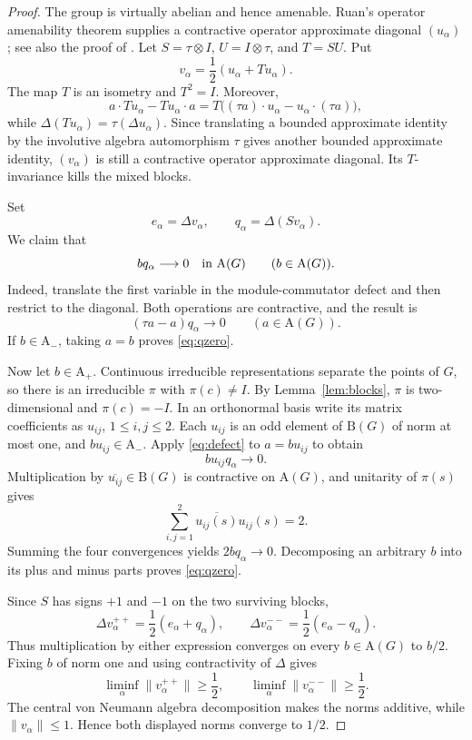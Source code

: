 \documentclass[11pt]{article}
\newcommand{\A}{\mathrm A}
\newcommand{\B}{\mathrm B}
\newcommand{\norm}[1]{\lVert #1\rVert}
\begin{document}
\begin{proof}
The group is virtually abelian and hence amenable.  Ruan's operator
amenability theorem supplies a contractive operator approximate diagonal
$(u_\alpha)$; see also the proof of \cite[Theorem 2.7]{Runde2006}.  Let
$S=\tau\otimes I$, $U=I\otimes\tau$, and $T=SU$.  Put
\[
 v_\alpha=\frac12(u_\alpha+Tu_\alpha).
\]
The map $T$ is an isometry and $T^2=I$.  Moreover,
\[
 a\cdot Tu_\alpha-Tu_\alpha\cdot a
 =T\bigl((\tau a)\cdot u_\alpha-u_\alpha\cdot(\tau a)\bigr),
\]
while $\Delta(Tu_\alpha)=\tau(\Delta u_\alpha)$.  Since translating a bounded
approximate identity by the involutive algebra automorphism $\tau$ gives
another bounded approximate identity, $(v_\alpha)$ is still a contractive
operator approximate diagonal.  Its $T$-invariance kills the mixed blocks.

Set
\[
 e_\alpha=\Delta v_\alpha,
 \qquad q_\alpha=\Delta(Sv_\alpha).
\]
We claim that
\begin{equation}\label{eq:qzero}
 bq_\alpha\longrightarrow0\quad\hbox{in }\A(G)
 \qquad(b\in\A(G)).
\end{equation}
Indeed, translate the first variable in the module-commutator defect and then
restrict to the diagonal.  Both operations are contractive, and the result is
\begin{equation}\label{eq:defect}
 (\tau a-a)q_\alpha\longrightarrow0
 \qquad(a\in\A(G)).
\end{equation}
If $b\in\A_-$, taking $a=b$ proves \eqref{eq:qzero}.

Now let $b\in\A_+$.  Continuous irreducible representations separate the
points of $G$, so there is an irreducible $\pi$ with $\pi(c)\ne I$.  By
Lemma~\ref{lem:blocks}, $\pi$ is two-dimensional and $\pi(c)=-I$.  In an
orthonormal basis write its matrix coefficients as $u_{ij}$, $1\le i,j\le2$.
Each $u_{ij}$ is an odd element of $\B(G)$ of norm at most one, and
$bu_{ij}\in\A_-$.  Apply \eqref{eq:defect} to $a=bu_{ij}$ to obtain
\[
 bu_{ij}q_\alpha\longrightarrow0.
\]
Multiplication by $\overline{u_{ij}}\in\B(G)$ is contractive on $\A(G)$, and
unitarity of $\pi(s)$ gives
\[
 \sum_{i,j=1}^2\overline{u_{ij}(s)}u_{ij}(s)=2.
\]
Summing the four convergences yields $2bq_\alpha\to0$.  Decomposing an
arbitrary $b$ into its plus and minus parts proves \eqref{eq:qzero}.

Since $S$ has signs $+1$ and $-1$ on the two surviving blocks,
\[
 \Delta v_\alpha^{++}=\frac12(e_\alpha+q_\alpha),
 \qquad
 \Delta v_\alpha^{--}=\frac12(e_\alpha-q_\alpha).
\]
Thus multiplication by either expression converges on every $b\in\A(G)$ to
$b/2$.  Fixing $b$ of norm one and using contractivity of $\Delta$ gives
\[
 \liminf_\alpha\norm{v_\alpha^{++}}\ge\frac12,
 \qquad
 \liminf_\alpha\norm{v_\alpha^{--}}\ge\frac12.
\]
The central von Neumann algebra decomposition makes the norms additive, while
$\norm{v_\alpha}\le1$.  Hence both displayed norms converge to $1/2$.
\end{proof}
\end{document}
